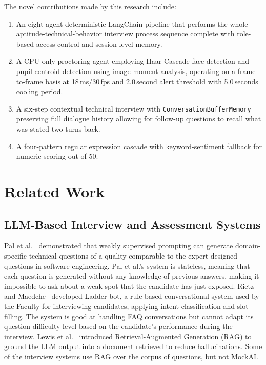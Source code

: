 \documentclass[conference]{IEEEtran}
\begin{document}
The novel contributions made by this research include:
\begin{enumerate}
  \item An eight-agent deterministic LangChain pipeline that performs
    the whole aptitude-technical-behavior interview process sequence
    complete with role-based access control and session-level memory.

  \item A CPU-only proctoring agent employing Haar Cascade face
    detection and pupil centroid detection using image moment analysis,
    operating on a frame-to-frame basis at 18\,ms/30\,fps and
    2.0\,second alert threshold with 5.0\,seconds cooling period.

  \item A six-step contextual technical interview with
    \texttt{ConversationBufferMemory} preserving full dialogue history
    allowing for follow-up questions to recall what was stated two turns
    back.

  \item A four-pattern regular expression cascade with keyword-sentiment
    fallback for numeric scoring out of 50.
\end{enumerate}

\section{Related Work}

\subsection{LLM-Based Interview and Assessment Systems}
Pal et al.~\cite{pal2022} demonstrated that weakly supervised prompting
can generate domain-specific technical questions of a quality comparable
to the expert-designed questions in software engineering. Pal et al.'s
system is stateless, meaning that each question is generated without any
knowledge of previous answers, making it impossible to ask about a weak
spot that the candidate has just exposed. Rietz and
Maedche~\cite{rietz2023} developed Ladder-bot, a rule-based
conversational system used by the Faculty for interviewing candidates,
applying intent classification and slot filling. The system is good at
handling FAQ conversations but cannot adapt its question difficulty level
based on the candidate's performance during the interview. Lewis et
al.~\cite{lewis2020} introduced Retrieval-Augmented Generation (RAG) to
ground the LLM output into a document retrieved to reduce hallucinations.
Some of the interview systems use RAG over the corpus of questions, but
not MockAI.
\end{document}
